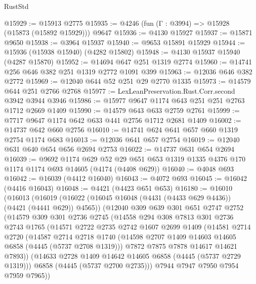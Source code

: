 \begin{lexlean}{RustStd}
\begin{coremodule}
@15929 := @15913 @2775
@15935 := @4246 (fun (Γ : @3994) => @15928 (@15873 (@15892 @15929))) @9647
@15936 := @4130 @15927
@15937 := @15871 @9650
@15938 := @3964 @15937
@15940 := @9653 @15891 @15929
@15944 := @15936 (@15938 @15940) (@4282 @15802)
@15948 := @4130 @15937 @15940 (@4287 @15870)
@15952 := @14694 @647 @251 @1319 @2774
@15960 := @14741 @256 @646 @382 @251 @1319 @2772 @1091 @399
@15963 := @12036 @646 @382 @2772
@15969 := @12040 @644 @52 @251 @29 @2770 @1335
@15973 := @14579 @644 @251 @2766 @2768
@15977 := LexLeanPreservation.Rust.Corr.second @3942 @3944 @3946
@15986 := @15977 @9647 @1174 @643 @251 @251 @2763 @1712 @2669 @1409
@15990 := @14579 @643 @633 @2759 @2761
@15999 := @7717 @9647 @1174 @642 @633 @441 @2756 @1712 @2681 @1409
@16002 := @14737 @642 @660 @2756
@16010 := @14741 @624 @641 @657 @660 @1319 @2754 @1174 @683
@16013 := @12036 @641 @657 @2754
@16019 := @12040 @631 @640 @654 @656 @2694 @2753
@16022 := @14737 @631 @654 @2694
@16039 := @9692
    @1174
    @629
    @52
    @29
    @651
    @653
    @1319
    @1335
    @4376
    @170
    @1174
    @1174
    @693
    @14605
    (@4174 (@4408 @629))
@16040 := @4048 @693
@16042 := @16039 (@4412 @16040)
@16043 := @4072 @693
@16045 := @16042 (@4416 @16043)
@16048 := @4421 (@4423 @651 @653)
@16180 := @16010
    (@16013
      (@16019
        (@16022 (@16045 @16048 (@4431 (@4433 @629 @4436)) (@4421 (@4441 @629)) @4565))
        (@12040
          @309
          @639
          @301
          @651
          @2747
          @2752
          (@14579
            @309
            @301
            @2736
            @2745
            (@14558
              @294
              @308
              @7813
              @301
              @2736
              @2743
              @1765
              (@14571
                @2722
                @2735
                @2742
                @1607
                @2699
                @1409
                (@14581
                  @2714
                  @2720
                  (@14587
                    @2714
                    @2718
                    @1740
                    (@14598 @2707 @1409 @14603 @14605 @6858 (@4445 (@5737 @2708 @1319)))
                    @7872
                    @7875
                    @7878
                    @14617
                    @14621
                    @7893))
                (@14633 @2728 @1409 @14642 @14605 @6858 (@4445 (@5737 @2729 @1319)))
                @6858
                (@4445 (@5737 @2700 @2735)))
              @7944
              @7947
              @7950
              @7954
              @7959
              @7965))

\end{coremodule}
\end{lexlean}
